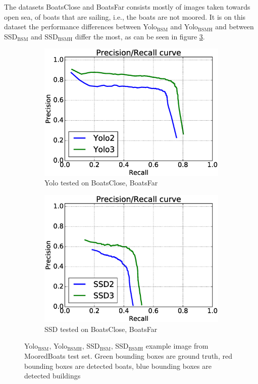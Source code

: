 The datasets BoatsClose and BoatsFar consists mostly of images taken towards open sea, of boats that are sailing, i.e., the boats are not moored. It is on this dataset the performance differences between Yolo$_{\text{BSM}}$ and Yolo$_{\text{BSMH}}$ and between SSD$_{\text{BSM}}$ and SSD$_{\text{BSMH}}$ differ the most, as can be seen in figure \ref{fig:bcbf_prec}.

\begin{figure}[h!]
\begin{subfigure}{.5\textwidth}
  \centering
  \includegraphics[width=0.8\linewidth]{results/case_buildings/prec_recall/yolo/bcbf.eps}
  \caption{Yolo tested on BoatsClose, BoatsFar}
  \label{fig:ex_bcbf_prec_rec_yolo}
\end{subfigure}%
\begin{subfigure}{.5\textwidth}
  \centering
  \includegraphics[width=.8\linewidth]{results/case_buildings/prec_recall/ssd/bcbf.eps}
  \caption{SSD tested on BoatsClose, BoatsFar}
  \label{fig:ex_bcbf_prec_rec_ssd}
\end{subfigure}
\caption{Yolo$_{\text{BSM}}$, Yolo$_{\text{BSMH}}$, SSD$_{\text{BSM}}$, SSD$_{\text{BSMH}}$ example image from MooredBoats test set. Green bounding boxes are ground truth, red bounding boxes are detected boats, blue bounding boxes are detected buildings}
\label{fig:bcbf_prec}
\end{figure}

